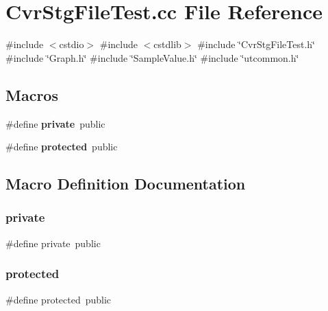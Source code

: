 \section{Cvr\+Stg\+File\+Test.\+cc File Reference}
\label{CvrStgFileTest_8cc}
{\ttfamily \#include $<$cstdio$>$}\newline
{\ttfamily \#include $<$cstdlib$>$}\newline
{\ttfamily \#include \char`\"{}Cvr\+Stg\+File\+Test.\+h\char`\"{}}\newline
{\ttfamily \#include \char`\"{}Graph.\+h\char`\"{}}\newline
{\ttfamily \#include \char`\"{}Sample\+Value.\+h\char`\"{}}\newline
{\ttfamily \#include \char`\"{}utcommon.\+h\char`\"{}}\newline
\subsection*{Macros}
\begin{DoxyCompactItemize}
\item 
\#define \textbf{ private}~public
\item 
\#define \textbf{ protected}~public
\end{DoxyCompactItemize}


\subsection{Macro Definition Documentation}
\mbox{\label{CvrStgFileTest_8cc_a6a1d6e1a12975a4e9a0b5b952e79eaad}} 
\subsubsection{private}
{\footnotesize\ttfamily \#define private~public}

\mbox{\label{CvrStgFileTest_8cc_a363c8dcebb1777654ad1703136a14ec8}} 
\subsubsection{protected}
{\footnotesize\ttfamily \#define protected~public}

